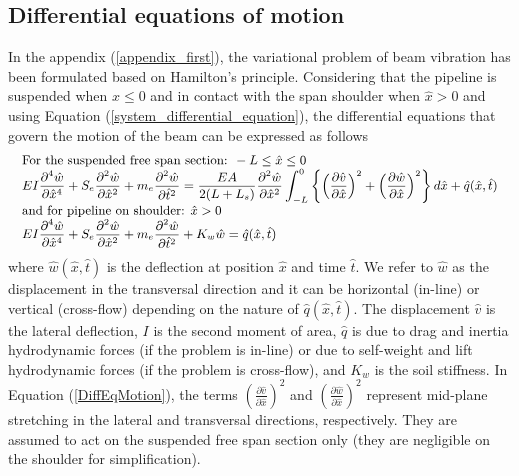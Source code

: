 \documentclass[3p,doublespacing,authoryear,11pt]{elsarticle} %
\begin{document}
\subsection{Differential equations of motion}
In the appendix (\ref{appendix_first}), the variational problem of beam vibration has been formulated based on Hamilton's principle. 
Considering that the pipeline is suspended when $\hat{x} \le 0$ and in contact with the span shoulder when $\hat{x} > 0$ and using Equation (\ref{system_differential_equation}), the differential equations that govern the motion of the beam can be expressed as follows
 \begin{equation}\label{DiffEqMotion}
 \small
 \begin{array}{l } 
 \text{For the suspended free span section: } -L \le \hat{x} \le 0 \\
\displaystyle  EI \frac{\partial^4 \hat{w}}{\partial \hat{x}^4} + S_e \frac{\partial^2 \hat{w}}{\partial \hat{x}^2}  + m_e \frac{\partial^2 \hat{w}}{\partial \hat{t}^2} = \frac{EA}{2(L+L_s)} \frac{\partial^2 \hat{w}}{\partial \hat{x}^2} \int_{-L}^0 \left\{\left( \frac{\partial \hat{v}}{\partial \hat{x}}  \right)^2 +  \left(\frac{\partial \hat{w}}{\partial \hat{x}}  \right)^2 \right\} d\hat{x} + \hat{q} (\hat{x},\hat{t}) \\
\text{and for pipeline on shoulder: }\hat{x} > 0 \\
\displaystyle  EI \frac{\partial^4 \hat{w}}{\partial \hat{x}^4} + S_e \frac{\partial^2 \hat{w}}{\partial \hat{x}^2} + m_e \frac{\partial^2 \hat{w}}{\partial \hat{t}^2} + K_w \hat{w}  =  \hat{q} (\hat{x},\hat{t})  
  \end{array}  
\end{equation}
where $\hat{w} (\hat{x},\hat{t})$ is the deflection at position $\hat{x}$ and time $\hat{t}$. We refer to $\hat{w}$ as the displacement in the transversal direction and it can be horizontal (in-line) or vertical (cross-flow) depending on the nature of $\hat{q} (\hat{x},\hat{t})$. The displacement $\hat{v}$ is the lateral deflection, $I$ is the second moment of area, $\hat{q}$ is due to drag and inertia hydrodynamic forces (if the problem is in-line) or due to self-weight and lift hydrodynamic forces (if the problem is cross-flow), and $K_w $ is the soil stiffness. In Equation (\ref{DiffEqMotion}), the terms $\left( \frac{\partial \hat{v}}{\partial \hat{x}}  \right)^2$ and $\left(\frac{\partial \hat{w}}{\partial \hat{x}}  \right)^2$ represent mid-plane stretching in the lateral and transversal directions, respectively. They are assumed to act on the suspended free span section only (they are negligible on the shoulder for simplification). 
\end{document}
